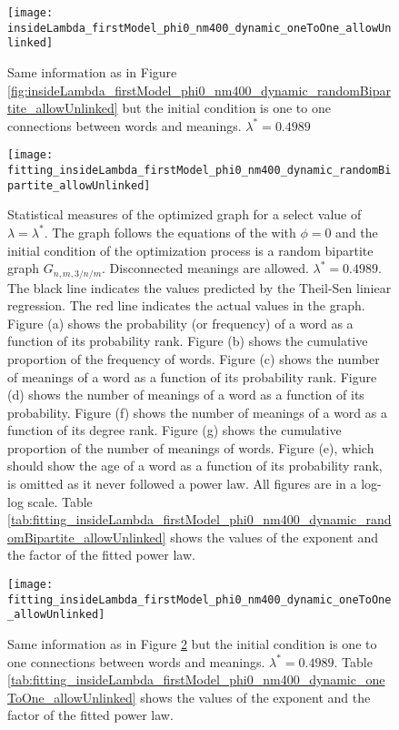 \begin{figure}
  \centering
  \texttt{[image: insideLambda\_firstModel\_phi0\_nm400\_dynamic\_oneToOne\_allowUnlinked]}
  \caption{Same information as in Figure \ref{fig:insideLambda_firstModel_phi0_nm400_dynamic_randomBipartite_allowUnlinked} but the initial condition is one to one connections between words and meanings. $\lambda^* = 0.4989$}
  \label{fig:insideLambda_firstModel_phi0_nm400_dynamic_oneToOne_allowUnlinked}
\end{figure}

\begin{figure}
  \centering
  \texttt{[image: fitting\_insideLambda\_firstModel\_phi0\_nm400\_dynamic\_randomBipartite\_allowUnlinked]}
  \caption{
    Statistical measures of the optimized graph for a select value of $\lambda=\lambda^*$.
    The graph follows the equations of the \firstmodel{} with $\phi=0$ and the initial condition of the optimization process is a random bipartite graph $G_{n,m,3/n/m}$. Disconnected meanings are allowed.
    $\lambda^*=0.4989$.
    The black line indicates the values predicted by the Theil-Sen liniear regression.
    The red line indicates the actual values in the graph.
    Figure (a) shows the probability (or frequency) of a word as a function of its probability rank.
    Figure (b) shows the cumulative proportion of the frequency of words.
    Figure (c) shows the number of meanings of a word as a function of its probability rank.
    Figure (d) shows the number of meanings of a word as a function of its probability.
    Figure (f) shows the number of meanings of a word as a function of its degree rank.
    Figure (g) shows the cumulative proportion of the number of meanings of words.
    Figure (e), which should show the age of a word as a function of its probability rank, is omitted as it never followed a power law.
    All figures are in a log-log scale.
    Table \ref{tab:fitting_insideLambda_firstModel_phi0_nm400_dynamic_randomBipartite_allowUnlinked} shows the values of the exponent and the factor of the fitted power law.
  }
  \label{fig:fitting_insideLambda_firstModel_phi0_nm400_dynamic_randomBipartite_allowUnlinked}
\end{figure}

\begin{figure}
  \centering
  \texttt{[image: fitting\_insideLambda\_firstModel\_phi0\_nm400\_dynamic\_oneToOne\_allowUnlinked]}
  \caption{Same information as in Figure \ref{fig:fitting_insideLambda_firstModel_phi0_nm400_dynamic_randomBipartite_allowUnlinked} but the initial condition is one to one connections between words and meanings. $\lambda^*=0.
4989$.
Table \ref{tab:fitting_insideLambda_firstModel_phi0_nm400_dynamic_oneToOne_allowUnlinked} shows the values of the exponent and the factor of the fitted power law.}
  \label{fig:fitting_insideLambda_firstModel_phi0_nm400_dynamic_oneToOne_allowUnlinked}
\end{figure}

